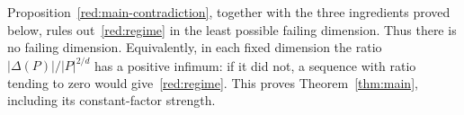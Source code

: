 Proposition~\ref{red:main-contradiction}, together with the three
ingredients proved below, rules out~\eqref{red:regime} in the least
possible failing dimension. Thus there is no failing dimension.
Equivalently, in each fixed dimension the ratio
\(|\Delta(P)|/|P|^{2/d}\) has a positive infimum: if it did not, a
sequence with ratio tending to zero would give~\eqref{red:regime}.
This proves Theorem~\ref{thm:main}, including its constant-factor
strength.
